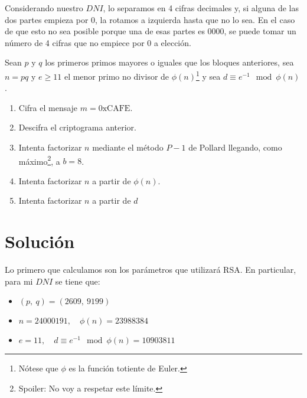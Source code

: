 	Considerando nuestro $DNI$, lo separamos en 4 cifras decimales y, si alguna de las dos partes empieza por 0,
	la rotamos a izquierda hasta que no lo sea. En el caso de que esto no sea posible porque una de esas partes
	es 0000, se puede tomar un número de 4 cifras que no empiece por 0 a elección.
	
	Sean $p$ y $q$ los primeros primos mayores o iguales que los bloques anteriores, sea $n = pq$ y $e \geq 11$
	el menor primo no divisor de $\phi(n)$\footnote{Nótese que $\phi$ es la función totiente de Euler.} y sea
	$d \equiv e^{-1} \mod \phi(n)$.
	\begin{enumerate}
		\item Cifra el mensaje $m = \mathrm{0xCAFE}$.
		\item Descifra el criptograma anterior.
		\item Intenta factorizar $n$ mediante el método $P-1$ de Pollard llegando, como máximo\footnote{Spoiler:
		No voy a respetar este límite.}, a $b = 8$.
		\item Intenta factorizar $n$ a partir de $\phi(n)$.
		\item Intenta factorizar $n$ a partir de $d$
	\end{enumerate}
\section*{Solución}
	Lo primero que calculamos son los parámetros que utilizará RSA. En particular, para mi $DNI$ se tiene que:
	\begin{itemize}
		\item $(p,\ q) = (2609,\ 9199)$
		\item $n = 24000191, \quad \phi(n) = 23988384$
		\item $e = 11, \quad d \equiv e^{-1} \mod \phi(n) = 10903811$
	\end{itemize}
	
